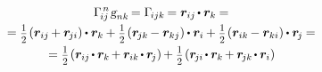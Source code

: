 \begin{otherlanguage}{russian}
\begin{multline}
\Gamma_{\hspace{-0.25ex}ij}^{\hspace{.25ex}n} \hspace{.16ex} \textsl{g}_{nk} \hspace{-0.24ex} = \Gamma_{\hspace{-0.25ex}ijk} \hspace{-0.2ex} = \bm{r}_{ij} \hspace{-0.2ex} \dotp \bm{r}_k \hspace{-0.1ex} = \\[-0.1em]
%
= \smalldisplaystyleonehalf \hspace{-0.2ex} \left( \bm{r}_{ij} \hspace{-0.16ex} + \bm{r}_{\hspace{-0.2ex}ji} \right) \hspace{-0.1ex} \dotp \bm{r}_k \hspace{-0.1ex}
+ \smalldisplaystyleonehalf \hspace{-0.2ex} \left( \bm{r}_{\hspace{-0.2ex}jk} \hspace{-0.16ex} - \bm{r}_{kj} \right) \hspace{-0.1ex} \dotp \bm{r}_i \hspace{-0.1ex}
+ \smalldisplaystyleonehalf \hspace{-0.2ex} \left( \bm{r}_{ik} \hspace{-0.16ex} - \bm{r}_{ki} \right) \hspace{-0.1ex} \dotp \bm{r}_{\hspace{-0.2ex}j} \hspace{-0.1ex} = \\[-0.12em]
%
= \smalldisplaystyleonehalf \hspace{-0.2ex} \left( \scalebox{0.96}[1]{$\bm{r}_{ij} \hspace{-0.2ex} \dotp \bm{r}_k \hspace{-0.16ex} + \bm{r}_{ik} \hspace{-0.2ex} \dotp \bm{r}_{\hspace{-0.2ex}j}$} \right) \hspace{-0.16ex}
+ \smalldisplaystyleonehalf \hspace{-0.2ex} \left( \scalebox{0.96}[1]{$\bm{r}_{\hspace{-0.2ex}ji} \hspace{-0.2ex} \dotp \bm{r}_k \hspace{-0.16ex} + \bm{r}_{\hspace{-0.2ex}jk} \hspace{-0.2ex} \dotp \bm{r}_i$} \right) \hspace{-0.16ex}

\end{multline}
\end{otherlanguage}
